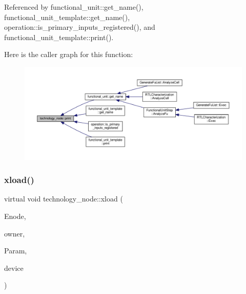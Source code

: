 Referenced by functional\+\_\+unit\+::get\+\_\+name(), functional\+\_\+unit\+\_\+template\+::get\+\_\+name(), operation\+::is\+\_\+primary\+\_\+inputs\+\_\+registered(), and functional\+\_\+unit\+\_\+template\+::print().

Here is the caller graph for this function\+:
\nopagebreak
\begin{figure}[H]
\begin{center}
\leavevmode
\includegraphics[width=350pt]{df/d06/structtechnology__node_a44f347bae9b9b59726f323b5a6ad9ebf_icgraph}
\end{center}
\end{figure}
\mbox{\label{structtechnology__node_aab3accd94480958219ca7771dd981a4f}} 
\subsubsection{\texorpdfstring{xload()}{xload()}}
{\footnotesize\ttfamily virtual void technology\+\_\+node\+::xload (\begin{DoxyParamCaption}\item[{const \hyperlink{classxml__element}{xml\+\_\+element} $\ast$}]{Enode,  }\item[{const \hyperlink{technology__node_8hpp_a33dd193b7bd6b987bf0d8a770a819fa7}{technology\+\_\+node\+Ref}}]{owner,  }\item[{const \hyperlink{Parameter_8hpp_a37841774a6fcb479b597fdf8955eb4ea}{Parameter\+Const\+Ref}}]{Param,  }\item[{const \hyperlink{target__device_8hpp_acedb2b7a617e27e6354a8049fee44eda}{target\+\_\+device\+Ref}}]{device }\end{DoxyParamCaption})\hspace{0.3cm}{\ttfamily [pure virtual]}}



